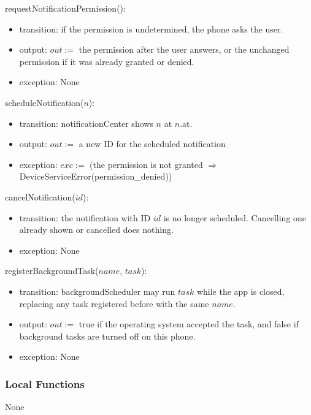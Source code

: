 \documentclass[12pt, titlepage]{article}
\begin{document}
\noindent requestNotificationPermission():
\begin{itemize}
\item transition: if the permission is undetermined, the phone asks the user.
\item output: $out :=$ the permission after the user answers, or the
  unchanged permission if it was already granted or denied.
\item exception: None
\end{itemize}

\noindent scheduleNotification($n$):
\begin{itemize}
\item transition: notificationCenter shows $n$ at $n$.at.
\item output: $out :=$ a new ID for the scheduled notification
\item exception: $exc :=$ (the permission is not granted $\Rightarrow$
  DeviceServiceError(permission\_denied))
\end{itemize}

\noindent cancelNotification($id$):
\begin{itemize}
\item transition: the notification with ID $id$ is no longer scheduled.
  Cancelling one already shown or cancelled does nothing.
\item exception: None
\end{itemize}

\noindent registerBackgroundTask($name$, $task$):
\begin{itemize}
\item transition: backgroundScheduler may run $task$ while the app is closed,
  replacing any task registered before with the same $name$.
\item output: $out :=$ true if the operating system accepted the task, and
  false if background tasks are turned off on this phone.
\item exception: None
\end{itemize}

\subsubsection{Local Functions}

None

\par\endgroup

\newpage



\end{document}

